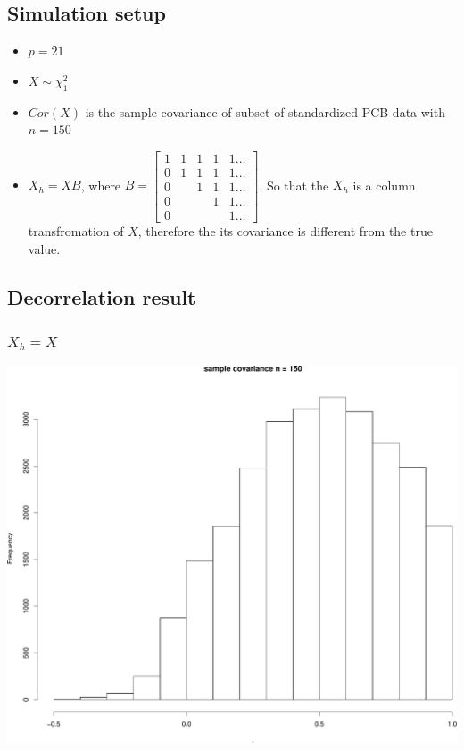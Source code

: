 \documentclass[]{article}
\providecommand{\tightlist}{%
  \setlength{\itemsep}{0pt}\setlength{\parskip}{0pt}}
\begin{document}
\subsection{Simulation setup}\label{simulation-setup}

\begin{itemize}
\tightlist
\item
  \(p = 21\)
\item
  \(X \sim \chi^2_1\)
\item
  \(Cor(X)\) is the sample covariance of subset of standardized PCB data
  with \(n = 150\)\\
\item
  \(X_h = XB\), where
  \(B = \begin{bmatrix} 1 & 1 & 1 & 1 &1\dots \\ 0 & 1& 1& 1& 1\dots\\ 0& & 1 & 1 & 1\dots\\ 0& & & 1& 1\dots\\ 0& & & & 1\dots \end{bmatrix}\).
  So that the \(X_h\) is a column transfromation of \(X\), therefore the
  its covariance is different from the true value.
\end{itemize}

\subsection{Decorrelation result}\label{decorrelation-result}

\subsubsection{\texorpdfstring{\(X_h = X\)}{X\_h = X}}\label{x_h-x}

\includegraphics{Low_levels_covariance_sparse_decorr_files/figure-latex/unnamed-chunk-2-1.pdf}
\end{document}
